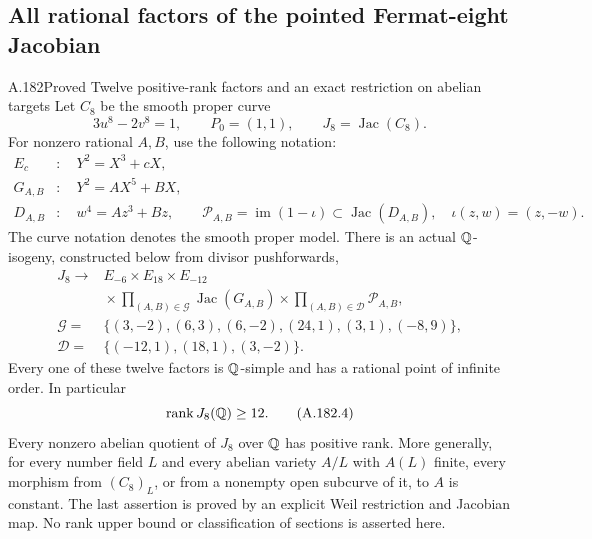 \subsection{All rational factors of the pointed Fermat-eight Jacobian}

\begin{statement}{A.182}{Proved}
{Twelve positive-rank factors and an exact restriction on abelian targets}
Let \(C_8\) be the smooth proper curve
\[
              3u^8-2v^8=1,\qquad P_0=(1,1),
                    \qquad J_8=\operatorname{Jac}(C_8).
\tag{A.182.1}
\]
For nonzero rational \(A,B\), use the following notation:
\[
\begin{aligned}
 E_c&:\quad Y^2=X^3+cX,\\
 G_{A,B}&:\quad Y^2=AX^5+BX,\\
 D_{A,B}&:\quad w^4=Az^3+Bz,\qquad
 \mathcal P_{A,B}=\operatorname{im}(1-\iota)
             \subset\operatorname{Jac}(D_{A,B}),
             \quad \iota(z,w)=(z,-w).
\end{aligned}
\tag{A.182.2}
\]
The curve notation denotes the smooth proper model.  There is an
actual \(\mathbb Q\)-isogeny, constructed below from divisor pushforwards,
\[
\begin{aligned}
 J_8\longrightarrow{}& E_{-6}\times E_{18}\times E_{-12}\\
 &{}\times\prod_{(A,B)\in\mathcal G}\operatorname{Jac}(G_{A,B})
       \times\prod_{(A,B)\in\mathcal D}\mathcal P_{A,B},\\
 \mathcal G={}&\{(3,-2),(6,3),(6,-2),(24,1),(3,1),(-8,9)\},\\
 \mathcal D={}&\{(-12,1),(18,1),(3,-2)\}.
\end{aligned}
\tag{A.182.3}
\]
Every one of these twelve factors is \(\mathbb Q\)-simple and has a
rational point of infinite order.  In particular
\[
                      \operatorname{rank}J_8(\mathbb Q)\geq12.
\tag{A.182.4}
\]
Every nonzero abelian quotient of \(J_8\) over \(\mathbb Q\) has positive
rank.  More generally, for every number field \(L\) and every
abelian variety \(A/L\) with \(A(L)\) finite, every morphism from
\((C_8)_L\), or from a nonempty open subcurve of it, to \(A\) is
constant.  The last assertion is proved by an explicit Weil
restriction and Jacobian map.  No rank upper bound or classification
of sections is asserted here.
\end{statement}

